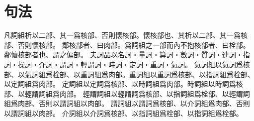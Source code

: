 \chapter*{句法}
凡詞組析以二部、其一爲核部、否則懷核部。懷核部也、其析以二部、其一爲核部、否則懷核部。
鄰核部者、曰肉部。爲詞組之一部而內不抱核部者、曰栓部。鄰懷核部者也、謂之偏部。
夫詞品以名詞・量詞・算詞・數詞・質詞・連詞・指詞・操詞・介詞・謂詞・輕謂詞・時詞・定詞・重詞・氣詞。
氣詞組以氣詞爲核部、以氣詞組爲栓部、以重詞組爲肉部。重詞組以重詞爲核部、以指詞組爲栓部、以定詞組爲肉部。
定詞組以定詞爲核部、以時詞組爲肉部。時詞組以時詞爲核部、以輕謂詞組爲肉部。
輕謂詞組以輕謂詞爲核部、以指詞組爲栓部、以輕謂詞組爲肉部、否則以謂詞組以肉部。
謂詞組以謂詞爲核部、以介詞組爲肉部、否則以謂詞組以肉部。
介詞組以介詞爲核部、以指詞組爲栓部、以指詞組爲栓部。
